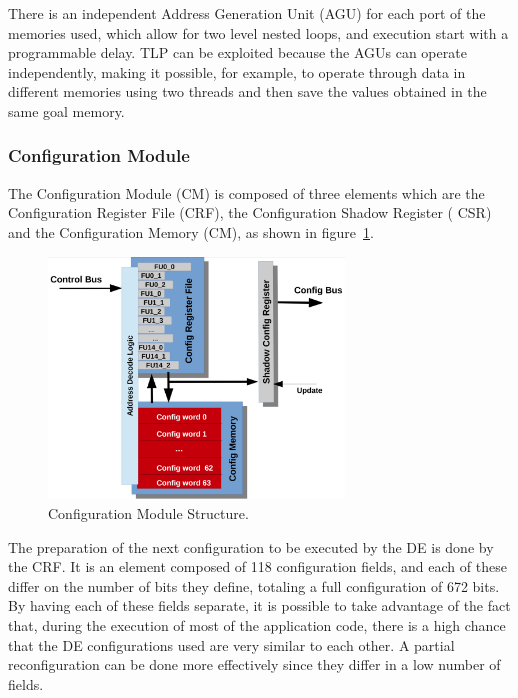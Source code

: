 There is an independent Address Generation Unit ({\sc AGU}) for each port of the
memories used, which allow for two level nested loops, and execution start with
a programmable delay.  {\sc TLP} can be exploited because the {\sc AGUs} can
operate independently, making it possible, for example, to operate through data
in different memories using two threads and then save the values obtained in the
same goal memory.

\subsubsection{Configuration Module}

The Configuration Module ({\sc CM}) is composed of three elements which are the
Configuration Register File ({\sc CRF}), the Configuration Shadow Register ({\sc
  CSR}) and the Configuration Memory ({\sc CM}), as shown in
figure~\ref{fig:config_module}.

\begin{figure}[!htbp]
    \centerline{\includegraphics[width=0.7\textwidth]{Figures/config_module.png}}
    \vspace{0cm}\caption{Configuration Module Structure.}
    \label{fig:config_module}
\end{figure}

The preparation of the next configuration to be executed by the {\sc DE} is done
by the {\sc CRF}. It is an element composed of 118 configuration fields, and each
of these differ on the number of bits they define, totaling a full configuration
of 672 bits. By having each of these fields separate, it is possible to take
advantage of the fact that, during the execution of most of the application
code, there is a high chance that the {\sc DE} configurations used are very
similar to each other.  A partial reconfiguration can be done more effectively
since they differ in a low number of fields.

